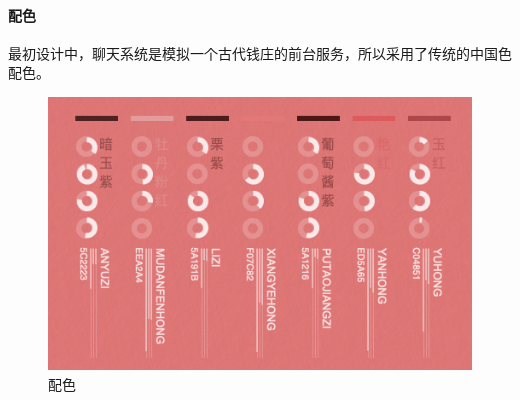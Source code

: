 \documentclass[hyperref]{ctexart}
\begin{document}
\paragraph{配色}
最初设计中，聊天系统是模拟一个古代钱庄的前台服务，所以采用了传统的中国色配色。
\begin{figure}[H]
    \centering
    \includegraphics[scale=0.5]{figure/13.png}
    \caption{配色}
    \label{Fig.1.13}
\end{figure}
\newpage
\end{document}
